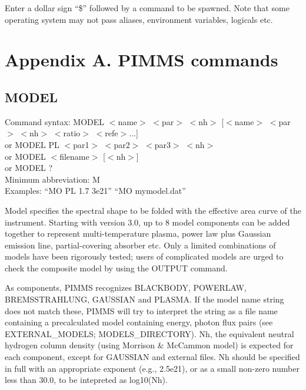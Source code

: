 Enter a dollar sign ``\$'' followed by a command to be spawned.  Note that some
operating system may not pass aliases, environment variables, logicals etc.

\pagebreak

\section*{Appendix A. PIMMS commands}

\subsection*{MODEL}

Command syntax: MODEL $<$name$>$ $<$par$>$ $<$nh$>$ [$<$name$>$ $<$par$>$ $<$nh$>$ $<$ratio$>$ $<$refe$>$...] \\
\hspace{1.5 cm} or MODEL PL $<$par1$>$ $<$par2$>$ $<$par3$>$ $<$nh$>$ \\
\hspace{1.5 cm} or MODEL $<$filename$>$ [$<$nh$>$] \\
\hspace{1.5 cm} or MODEL ? \\
Minimum abbreviation: M \\
Examples: ``MO PL 1.7 3e21'' ``MO mymodel.dat'' \\
\vspace{0.5 cm}

Model specifies the spectral shape to be folded  with the effective area curve
of the instrument.  Starting with version 3.0, up to 8 model components can be
added together to represent multi-temperature plasma,  power law plus Gaussian
emission line, partial-covering absorber etc.   Only a limited combinations of
models have been rigorously tested;   users of complicated models are urged to 
check the composite model by using the OUTPUT command.

As components, PIMMS recognizes  BLACKBODY, POWERLAW, BREMSSTRAHLUNG, GAUSSIAN
and PLASMA.   If the model name string does  not match these, PIMMS will
try to interpret the string  as a file name containing  a precalculated  model
containing energy, photon flux pairs (see EXTERNAL\_MODELS; MODELS\_DIRECTORY).
Nh, the equivalent neutral hydrogen column density  (using Morrison \& McCammon
model) is expected for each component, except for GAUSSIAN and external files.
Nh should be specified in full with an appropriate exponent (e.g., 2.5e21), or
as a small non-zero number less than 30.0, to be intepreted as log10(Nh).

